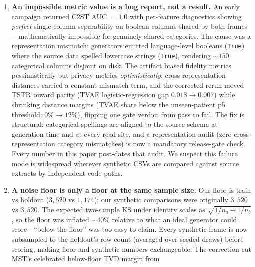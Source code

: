 \documentclass[11pt,a4paper]{article}
\begin{document}
\begin{enumerate}
outputs are wiped and regenerated on every rerun; the evaluation re-decodes each
released file on a copy and loudly flags any cell an up-to-date decoder would
change (a stale file is scored as-is, never silently fixed); per-run summaries are
rewritten after every model so an interrupted campaign keeps everything already
finished; and per-run timeouts are calibrated from measured runtimes (a 6-hour cap
chosen so that MST's legitimate 2.9-hour fits survive while a wedged fit cannot
consume a night). The release gate that blocks our own candidate
files (Section~\ref{sec:gate}) is this philosophy applied at the boundary.
\item \textbf{An impossible metric value is a bug report, not a result.} An early
campaign returned C2ST AUC $= 1.0$ with per-feature diagnostics showing
\emph{perfect} single-column separability on boolean columns shared by both
frames---mathematically impossible for genuinely shared categories. The cause was a
representation mismatch: generators emitted language-level booleans
(\texttt{True}) where the source data spelled lowercase strings (\texttt{true}),
rendering ${\sim}150$ categorical columns disjoint on disk. The artifact biased
fidelity metrics pessimistically but privacy metrics \emph{optimistically}:
cross-representation distances carried a constant mismatch term, and the corrected
rerun moved TSTR toward parity (TVAE logistic-regression gap $0.018 \to 0.007$)
while shrinking distance margins (TVAE share below the unseen-patient p5
threshold: $0\% \to 12\%$), flipping one gate verdict from pass to fail. The fix
is structural: categorical spellings are aligned to the source schema at
generation time and at every read site, and a representation audit (zero
cross-representation category mismatches) is now a mandatory release-gate check.
Every number in this paper post-dates that audit. We suspect this failure mode is
widespread wherever synthetic CSVs are compared against source extracts by
independent code paths.
\item \textbf{A noise floor is only a floor at the same sample size.} Our floor is
train vs holdout ($3{,}520$ vs $1{,}174$); our synthetic comparisons were
originally $3{,}520$ vs $3{,}520$. The expected two-sample KS under identity
scales as $\sqrt{1/n_a + 1/n_b}$, so the floor was inflated ${\sim}40\%$ relative
to what an ideal generator could score---``below the floor'' was too easy to
claim. Every synthetic frame is now subsampled to the holdout's row count
(averaged over seeded draws) before scoring, making floor and synthetic numbers
exchangeable. The correction cut MST's celebrated below-floor TVD margin from

\end{enumerate}
\end{document}
